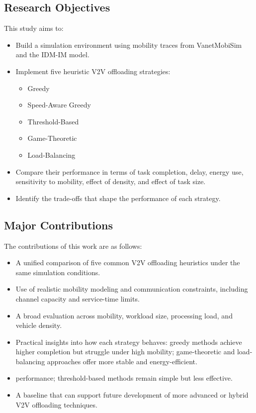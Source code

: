 \documentclass[conference]{IEEEtran}
\begin{document}
\subsection{Research Objectives}
This study aims to:
\begin{itemize}
    \item Build a simulation environment using mobility traces from VanetMobiSim and the IDM-IM model.
    \item Implement five heuristic V2V offloading strategies:
        \begin{itemize}
            \item Greedy
            \item Speed-Aware Greedy
            \item Threshold-Based
            \item Game-Theoretic
            \item Load-Balancing
        \end{itemize}
    \item Compare their performance in terms of task completion, delay, energy use, sensitivity to mobility, effect of density, and effect of task size.
    \item Identify the trade-offs that shape the performance of each strategy.
\end{itemize}

\subsection{Major Contributions}\label{AA}
The contributions of this work are as follows:
\begin{itemize}
    \item A unified comparison of five common V2V offloading heuristics under the same simulation conditions.
    \item Use of realistic mobility modeling and communication constraints, including channel capacity and service-time limits.
    \item A broad evaluation across mobility, workload size, processing load, and vehicle density.
    \item Practical insights into how each strategy behaves: greedy methods achieve higher completion but struggle under high mobility; game-theoretic and load-balancing approaches offer more stable and energy-efficient.
    \item performance; threshold-based methods remain simple but less effective.
    \item A baseline that can support future development of more advanced or hybrid V2V offloading techniques.
\end{itemize}
\end{document}
